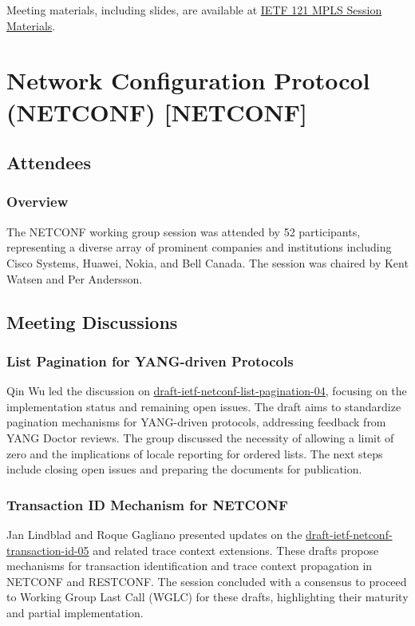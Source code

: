 \documentclass{article}
\begin{document}
Meeting materials, including slides, are available at \href{https://datatracker.ietf.org/meeting/121/session/mpls/}{IETF 121 MPLS Session Materials}.




\newpage

\section{Network Configuration Protocol (NETCONF) [NETCONF]}

\subsection{Attendees}
\subsubsection{Overview}
The NETCONF working group session was attended by 52 participants, representing a diverse array of prominent companies and institutions including Cisco Systems, Huawei, Nokia, and Bell Canada. The session was chaired by Kent Watsen and Per Andersson.

\subsection{Meeting Discussions}

\subsubsection{List Pagination for YANG-driven Protocols}
Qin Wu led the discussion on \href{https://datatracker.ietf.org/doc/html/draft-ietf-netconf-list-pagination-04}{draft-ietf-netconf-list-pagination-04}, focusing on the implementation status and remaining open issues. The draft aims to standardize pagination mechanisms for YANG-driven protocols, addressing feedback from YANG Doctor reviews. The group discussed the necessity of allowing a limit of zero and the implications of locale reporting for ordered lists. The next steps include closing open issues and preparing the documents for publication.

\subsubsection{Transaction ID Mechanism for NETCONF}
Jan Lindblad and Roque Gagliano presented updates on the \href{https://datatracker.ietf.org/doc/html/draft-ietf-netconf-transaction-id-05}{draft-ietf-netconf-transaction-id-05} and related trace context extensions. These drafts propose mechanisms for transaction identification and trace context propagation in NETCONF and RESTCONF. The session concluded with a consensus to proceed to Working Group Last Call (WGLC) for these drafts, highlighting their maturity and partial implementation.
\end{document}
